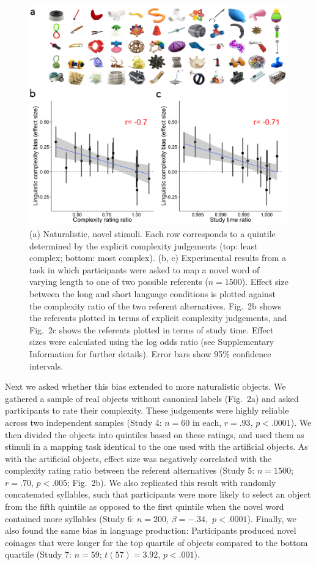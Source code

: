 \documentclass[12pt]{article}
\begin{document}
\begin{figure}[ht!]
\begin{center}
\includegraphics{figs/FIG_2.png}
\caption{(a) Naturalistic, novel stimuli. Each row corresponds to a quintile determined by the explicit complexity judgements (top: least complex; bottom: most complex). (b, c) Experimental results from a task in which participants were asked to map a novel word of varying length to one of two possible referents ($n=1500$). Effect size between the long and short language conditions is plotted against the complexity ratio of the two referent alternatives. Fig.\ 2b shows the referents plotted in terms of explicit complexity judgements, and Fig.\ 2c shows the referents plotted in terms of study time. Effect sizes were calculated using the log odds ratio (see Supplementary Information for further details). Error bars show 95\% confidence intervals.}
\end{center}
\label{fig:real_objs}
\end{figure}

Next we asked whether this bias extended to more naturalistic objects. We gathered a sample of real objects without canonical labels (Fig.\ 2a) and asked participants to rate their complexity. These judgements were highly reliable across two independent samples (Study 4: $n = 60$ in each, $r = .93$, $p < .0001$). We then divided the objects into quintiles based on these ratings, and used them as stimuli in a mapping task identical to the one used with the artificial objects. As with the artificial objects, effect size was negatively correlated with the complexity rating ratio between the referent alternatives (Study 5: $n = 1500$; $r = .70$, $p < .005$; Fig.\ 2b). We also replicated this result with randomly concatenated syllables, such that participants were more likely to select an object from the fifth quintile as opposed to the first quintile when the novel word contained more syllables (Study 6: $n=200$, $\beta=-.34,$ $p <.0001$). Finally, we also found the same bias in language production: Participants produced novel coinages that were longer for the top quartile of objects compared to the bottom quartile (Study 7: $n = 59$; $t(57) = 3.92$, $p < .001$). 
					
\end{document}
